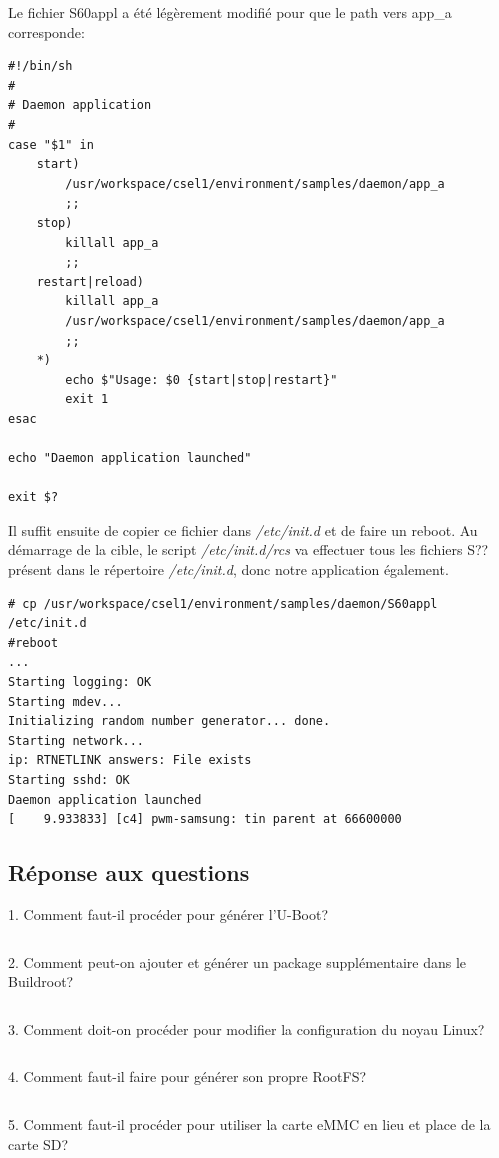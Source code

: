 Le fichier S60appl a été légèrement modifié pour que le path vers app\_a corresponde:
\begin{lstlisting}
#!/bin/sh
#
# Daemon application
#
case "$1" in
	start)
		/usr/workspace/csel1/environment/samples/daemon/app_a
		;;
	stop)
		killall app_a
		;;
	restart|reload)
		killall app_a
		/usr/workspace/csel1/environment/samples/daemon/app_a
		;;
	*)
		echo $"Usage: $0 {start|stop|restart}"
		exit 1
esac

echo "Daemon application launched"

exit $?
\end{lstlisting}
Il suffit ensuite de copier ce fichier dans \textit{/etc/init.d} et de faire un reboot. Au démarrage de la cible, le script \textit{/etc/init.d/rcs} va effectuer tous les fichiers S?? présent dans le répertoire \textit{/etc/init.d}, donc notre application également.
\begin{lstlisting}
# cp /usr/workspace/csel1/environment/samples/daemon/S60appl /etc/init.d
#reboot
...
Starting logging: OK                                                            
Starting mdev...                                                                
Initializing random number generator... done.                                   
Starting network...                                                             
ip: RTNETLINK answers: File exists                                              
Starting sshd: OK                                                               
Daemon application launched                                                     
[    9.933833] [c4] pwm-samsung: tin parent at 66600000  
\end{lstlisting}
\subsection{Réponse aux questions}
1. Comment faut-il procéder pour générer l'U-Boot?
\begin{lstlisting}

\end{lstlisting}
2. Comment peut-on ajouter et générer un package supplémentaire dans le Buildroot?
\begin{lstlisting}

\end{lstlisting}
3. Comment doit-on procéder pour modifier la configuration du noyau Linux?
\begin{lstlisting}

\end{lstlisting}
4. Comment faut-il faire pour générer son propre RootFS?
\begin{lstlisting}

\end{lstlisting}
5. Comment faut-il procéder pour utiliser la carte eMMC en lieu et place de la carte SD?
\begin{lstlisting}

\end{lstlisting}


